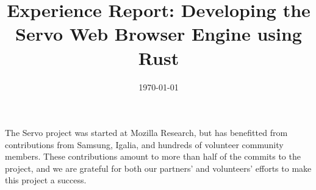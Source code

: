 \documentclass[preprint]{../common/sigplanconf}
\title{Experience Report: Developing the Servo Web Browser Engine using Rust}
\date{\today}
\begin{document}
\maketitle
\thispagestyle{empty}

\sloppy









\acks
The Servo project was started at Mozilla Research, but has benefitted from
contributions from Samsung, Igalia, and hundreds of volunteer community members.
These contributions amount to more than half of the commits to the project,
and we are grateful for both our partners' and volunteers' efforts to make
this project a success.




\end{document}

